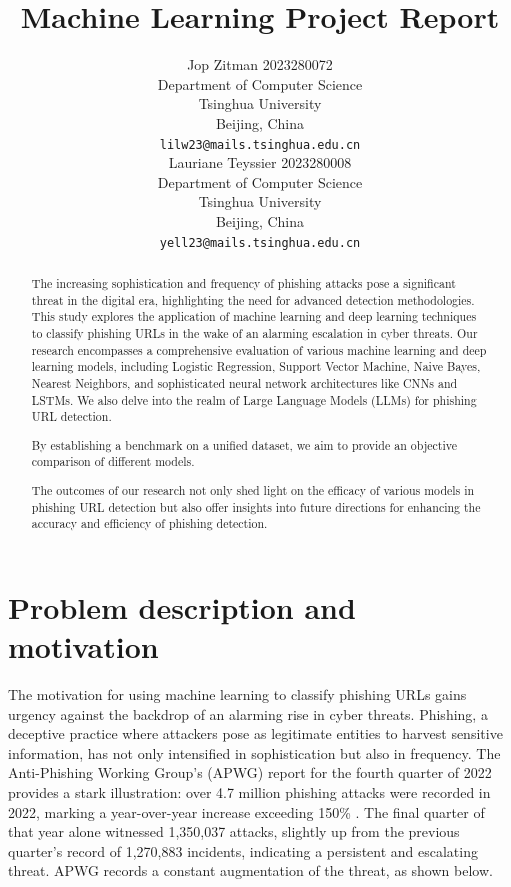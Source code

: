 \documentclass{article}
\title{Machine Learning Project Report}
\author{
    Jop Zitman 2023280072\\
    Department of Computer Science\\
    Tsinghua University\\
    Beijing, China \\
    \texttt{lilw23@mails.tsinghua.edu.cn} \\
    \And
    Lauriane Teyssier 2023280008\\
    Department of Computer Science\\
    Tsinghua University\\
    Beijing, China \\
    \texttt{yell23@mails.tsinghua.edu.cn} \\
}
\begin{document}
    \maketitle

    \begin{abstract}
        The increasing sophistication and frequency of phishing attacks pose a significant threat in the digital era, highlighting the need for advanced detection methodologies.
        This study explores the application of machine learning and deep learning techniques to classify phishing URLs in the wake of an alarming escalation in cyber threats.
        Our research encompasses a comprehensive evaluation of various machine learning and deep learning models, including Logistic Regression, Support Vector Machine, Naive Bayes, Nearest Neighbors, and sophisticated neural network architectures like CNNs and LSTMs. We also delve into the realm of Large Language Models (LLMs) for phishing URL detection.

        By establishing a benchmark on a unified dataset, we aim to provide an objective comparison of different models.

        The outcomes of our research not only shed light on the efficacy of various models in phishing URL detection but also offer insights into future directions for enhancing the accuracy and efficiency of phishing detection.
    \end{abstract}

    \newpage
    \tableofcontents
    \newpage


    \section{Problem description and motivation}\label{sec:problem-description-and-motivation}

    The motivation for using machine learning to classify phishing URLs gains urgency against the backdrop of an alarming rise in cyber threats.
    Phishing, a deceptive practice where attackers pose as legitimate entities to harvest sensitive information, has not only intensified in sophistication but also in frequency.
    The Anti-Phishing Working Group's (APWG) report for the fourth quarter of 2022 provides a stark illustration: over 4.7 million phishing attacks were recorded in 2022, marking a year-over-year increase exceeding 150\% \cite{PhishingActivityTrendsReport}.
    The final quarter of that year alone witnessed 1,350,037 attacks, slightly up from the previous quarter's record of 1,270,883 incidents, indicating a persistent and escalating threat.
    APWG records a constant augmentation of the threat, as shown below.
\end{document}
